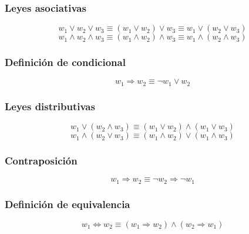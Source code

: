 \documentclass[10pt,a4paper,openright]{book}
\begin{document}
\begin{multicols}{2}
\subsubsection*{Leyes asociativas}
$$w_1 \vee w_2 \vee w_3 \equiv (w_1 \vee w_2) \vee w_3 \equiv w_1 \vee (w_2 \vee w_3)$$
$$w_1 \wedge w_2 \wedge w_3 \equiv (w_1 \wedge w_2 ) \wedge w_3 \equiv w_1 \wedge (w_2 \wedge w_3)$$  
\subsubsection*{Definición de condicional}
$$w_1 \Rightarrow w_2 \equiv \neg w_1 \vee w_2$$
\subsubsection*{Leyes distributivas}
$$w_1 \vee (w_2 \wedge w_3) \equiv (w_1 \vee w_2) \wedge (w_1 \vee w_3)$$
$$w_1 \wedge (w_2 \vee w_3) \equiv (w_1 \wedge w_2) \vee (w_1 \wedge w_3)$$
\subsubsection*{Contraposición}
$$w_1 \Rightarrow w_2 \equiv \neg w_2 \Rightarrow \neg w_1$$
\subsubsection*{Definición de equivalencia}
$$w_1 \Leftrightarrow w_2 \equiv (w_1 \Rightarrow w_2) \wedge (w_2 \Rightarrow w_1)$$
\end{multicols}
\end{document}
